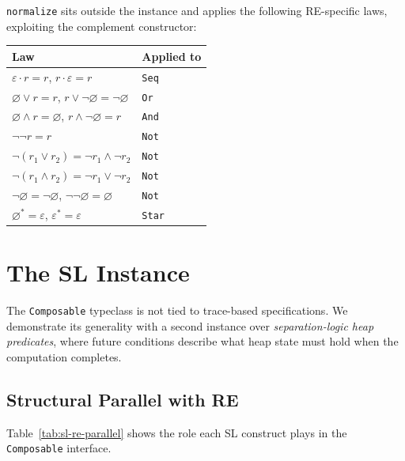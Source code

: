 \documentclass[acmsmall,screen]{acmart}
\newcommand{\univ}{\neg\varnothing}
\begin{document}
\lstinline{normalize} sits outside the instance and applies the
following RE-specific laws, exploiting the complement constructor:

\begin{center}
\begin{tabular}{ll}
\toprule
Law & Applied to \\
\midrule
$\varepsilon \cdot r = r$, $r \cdot \varepsilon = r$ & \lstinline{Seq} \\
$\varnothing \vee r = r$, $r \vee \univ = \univ$ & \lstinline{Or} \\
$\varnothing \wedge r = \varnothing$, $r \wedge \univ = r$ & \lstinline{And} \\
$\neg\neg r = r$ & \lstinline{Not} \\
$\neg(r_1\vee r_2) = \neg r_1\wedge\neg r_2$ & \lstinline{Not} \\
$\neg(r_1\wedge r_2) = \neg r_1\vee\neg r_2$ & \lstinline{Not} \\
$\neg\varnothing = \univ$, $\neg\univ = \varnothing$ & \lstinline{Not} \\
$\varnothing^* = \varepsilon$, $\varepsilon^* = \varepsilon$ & \lstinline{Star} \\
\bottomrule
\end{tabular}
\end{center}

\section{The SL Instance}
\label{sec:sl-instance}

The \lstinline{Composable} typeclass is not tied to trace-based specifications.
We demonstrate its generality with a second instance over
\emph{separation-logic heap predicates}, where future conditions describe
what heap state must hold when the computation completes.

\subsection{Structural Parallel with RE}

Table~\ref{tab:sl-re-parallel} shows the role each SL construct plays in
the \lstinline{Composable} interface.
\end{document}
